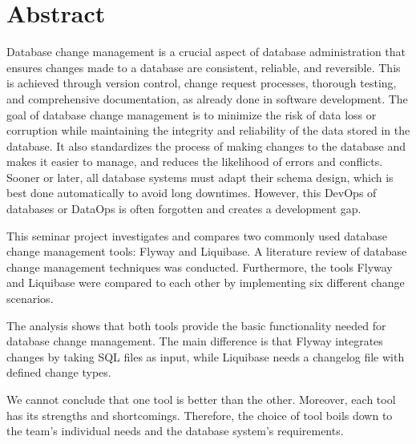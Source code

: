 \markleft{\abstractname}

\chapter*{Abstract}
%
Database change management is a crucial aspect of database administration that ensures changes made to a database are consistent, reliable, and reversible. This is achieved through version control, change request processes, thorough testing, and comprehensive documentation, as already done in software development. The goal of database change management is to minimize the risk of data loss or corruption while maintaining the integrity and reliability of the data stored in the database. It also standardizes the process of making changes to the database and makes it easier to manage, and reduces the likelihood of errors and conflicts. Sooner or later, all database systems must adapt their schema design, which is best done automatically to avoid long downtimes. However, this DevOps of databases or DataOps is often forgotten and creates a development gap. 

%
This seminar project investigates and compares two commonly used database change management tools: Flyway and Liquibase. A literature review of database change management techniques was conducted. Furthermore, the tools Flyway and Liquibase were compared to each other by implementing six different change scenarios.

%
The analysis shows that both tools provide the basic functionality needed for database change management. The main difference is that Flyway integrates changes by taking SQL files as input, while Liquibase needs a changelog file with defined change types.

%
We cannot conclude that one tool is better than the other. Moreover, each tool has its strengths and shortcomings. Therefore, the choice of tool boils down to the team's individual needs and the database system's requirements.


